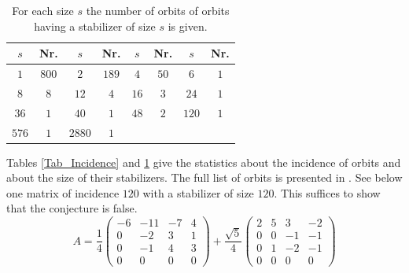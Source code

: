 \documentclass[12pt]{amsart}
\begin{document}
\begin{table}
\begin{center}
\begin{tabular}{|cc|cc|cc|cc|}
\hline
$s$  & Nr.      &    $s$  & Nr.      &    $s$  & Nr.      &    $s$  & Nr.\\\hline
$1$ & $800$    &    $2$ & $189$    &    $4$ & $50$    &    $6$ & $1$\\
$8$ & $8$    &    $12$ & $4$    &    $16$ & $3$    &    $24$ & $1$\\
$36$ & $1$    &    $40$ & $1$    &    $48$ & $2$    &    $120$ & $1$\\
$576$ & $1$    &    $2880$ & $1$    &       &          &         &          \\
\hline
\end{tabular}
\caption{For each size $s$ the number of orbits of orbits having a stabilizer of size $s$ is given.}\label{Tab_StabSiz}
\end{center}
\end{table}


Tables \ref{Tab_Incidence} and \ref{Tab_StabSiz} give the statistics about the incidence of orbits and about the size of their
stabilizers. The full list of orbits is presented in \cite{convcoxeterresult}. See below one matrix of incidence $120$ with a
stabilizer of size $120$. This suffices to show that the conjecture is false.
\begin{equation*}
A=\frac{1}{4}\left(\begin{array}{cccc}
-6 & -11 & -7 & 4\\
0 & -2 & 3 & 1\\
0 & -1 & 4 & 3\\
0 & 0 & 0 & 0
\end{array}\right)
+\frac{\sqrt{5} }{4}\left(\begin{array}{cccc}
2 & 5 & 3 & -2\\
0 & 0 & -1 & -1\\
0 & 1 & -2 & -1\\
0 & 0 & 0 & 0
\end{array}\right)
\end{equation*}
\end{document}
